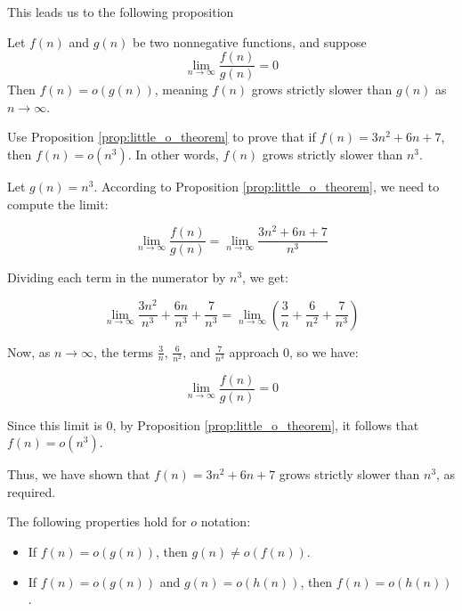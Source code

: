 This leads us to the following proposition

\begin{proposition} \label{prop:little_o_theorem}
    Let \( f(n) \) and \( g(n) \) be two nonnegative functions, and suppose
    \medskip
    \[
    \lim_{n \rightarrow \infty} \frac{f(n)}{g(n)} = 0
    \]
    \medskip
    Then \( f(n) = o(g(n)) \), meaning \( f(n) \) grows strictly slower than \( g(n) \) as \( n \to \infty \).
\end{proposition}

\begin{example}
    Use Proposition \ref{prop:little_o_theorem} to prove that if \( f(n) = 3n^2 + 6n + 7 \), then \( f(n) = o(n^3) \). In other words, \( f(n) \) grows strictly slower than \( n^3 \).

\end{example}

\begin{solution}
    
    Let \( g(n) = n^3 \). According to Proposition \ref{prop:little_o_theorem}, we need to compute the limit:
    
    \[
    \lim_{n \to \infty} \frac{f(n)}{g(n)} = \lim_{n \to \infty} \frac{3n^2 + 6n + 7}{n^3}
    \]
    
    Dividing each term in the numerator by \( n^3 \), we get:
    
    \[
    \lim_{n \to \infty} \frac{3n^2}{n^3} + \frac{6n}{n^3} + \frac{7}{n^3} = \lim_{n \to \infty} \left( \frac{3}{n} + \frac{6}{n^2} + \frac{7}{n^3} \right)
    \]
    
    Now, as \( n \to \infty \), the terms \( \frac{3}{n} \), \( \frac{6}{n^2} \), and \( \frac{7}{n^3} \) approach \( 0 \), so we have:
    
    \[
    \lim_{n \to \infty} \frac{f(n)}{g(n)} = 0
    \]
    
    Since this limit is \( 0 \), by Proposition \ref{prop:little_o_theorem}, it follows that \( f(n) = o(n^3) \).
    
    Thus, we have shown that \( f(n) = 3n^2 + 6n + 7 \) grows strictly slower than \( n^3 \), as required.
\end{solution}

The following properties hold for $o$ notation:
\begin{itemize}
    \item If $f(n) = o(g(n))$, then $g(n) \neq o(f(n))$.
    \item If $f(n) = o(g(n))$ and $g(n) = o(h(n))$, then $f(n) = o(h(n))$.
\end{itemize}


